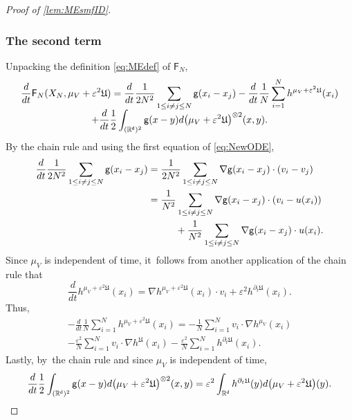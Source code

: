 \documentclass[10pt]{amsart}
\theoremstyle{plain}
\theoremstyle{definition}
\DeclarePairedDelimiter{\pa}{\lparen}{\rparen}
\newcommand{\R}{{\mathbb{R}}}
\let\vep\varepsilon
\let\p\partial
\let\ux X
\newcommand{\Uu}{\mathfrak{U}}
\newcommand{\Fr}{\mathsf{F}}
\renewcommand{\d}{\mathsf{d}}
\newcommand{\g}{{\mathsf{g}}}
\begin{document}
\begin{proof}[Proof of \cref{lem:MEsmfID}]
\subsubsection*{The second term} Unpacking the definition \eqref{eq:MEdef} of $\Fr_N$,\vspace*{-5pt}
\begin{multline*}
\frac{d}{dt} \Fr_N(\ux_N, \mu_V + \vep^2\Uu) = \frac{d}{dt}\frac{1}{2N^2}\sum_{1\leq i\neq j\leq N}\g(x_i-x_j) - \frac{d}{dt}\frac{1}{N}\sum_{i=1}^N h^{\mu_V + \vep^2\Uu}(x_i) \\[-5pt]
+ \frac{d}{dt} \frac{1}{2}\int_{(\R^\d)^2} \g(x-y) d\pa*{\mu_V+\vep^2\Uu}^{\otimes 2}(x,y).
\end{multline*}
By the chain rule and using the first equation of \eqref{eq:NewODE},\vspace*{-5pt}
\begin{equation}
\label{eq:dtFcon1}
\begin{aligned}
\frac{d}{dt}\frac{1}{2N^2}\sum_{1\leq i\neq j\leq N}\g(x_i-x_j) &= \frac{1}{2N^2}\sum_{1\leq i\neq j\leq N} \nabla\g(x_i-x_j)\cdot\pa*{v_i-v_j}\\
&= \frac{1}{N^2}\sum_{1\leq i\neq j\leq N} \nabla\g(x_i-x_j)\cdot \pa*{v_i - u(x_i)}\\
&\hspace*{1cm}+ \frac{1}{N^2}\sum_{1\leq i\neq j\leq N}\nabla\g(x_i-x_j)\cdot u(x_i). 
\end{aligned}
\end{equation}
Since $\mu_V$ is independent of time, it~follows from another application of the chain rule that\vspace*{-5pt}
\begin{equation*}
\frac{d}{dt}h^{\mu_V + \vep^2\Uu}(x_i) = \nabla h^{\mu_V+\vep^2\Uu}(x_i)\cdot v_i + \vep^2 h^{\p_t\Uu}(x_i).
\end{equation*}
Thus,\vspace*{-5pt}
\begin{multline}\label{eq:dtFcon2}
- \frac{d}{dt}\frac{1}{N}\sum_{i=1}^N h^{\mu_V + \vep^2\Uu}(x_i) = -\frac{1}{N}\sum_{i=1}^N v_i\cdot\nabla h^{\mu_V}(x_i) \\[-8pt]
- \frac{\vep^2}{N}\sum_{i=1}^N v_i \cdot \nabla h^{\Uu}(x_i) - \frac{\vep^2}{N}\sum_{i=1}^N h^{\p_t\Uu}(x_i).
\end{multline}
Lastly, by~the chain rule and since $\mu_V$ is independent of time,\vspace*{-3pt}
\begin{equation}\label{eq:dtFcon3}
\frac{d}{dt} \frac{1}{2}\int_{(\R^\d)^2} \g(x-y) d\pa*{\mu_V+\vep^2\Uu}^{\otimes 2}(x,y) = \vep^2\int_{\R^\d} h^{\p_t\Uu}(y)d\pa*{\mu_V+\vep^2\Uu}(y).

\end{equation}
\end{proof}
\end{document}
